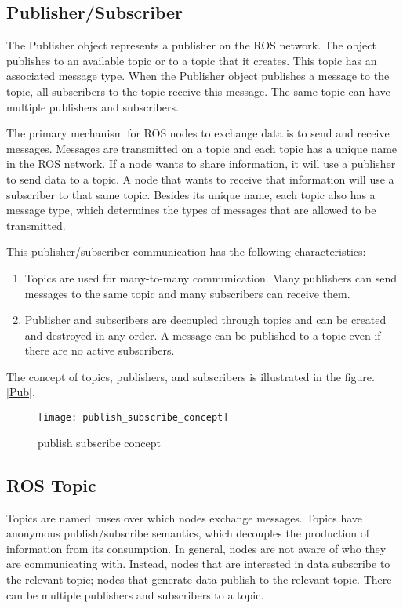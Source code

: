 \subsection{Publisher/Subscriber}
	The Publisher object represents a publisher on the ROS network. The object publishes to an available topic or to a topic that it creates. This topic has an associated message type. When the Publisher object publishes a message to the topic, all subscribers to the topic receive this message. The same topic can have multiple publishers and subscribers.
	
	The primary mechanism for ROS nodes to exchange data is to send and receive messages. Messages are transmitted on a topic and each topic has a unique name in the ROS network. If a node wants to share information, it will use a publisher to send data to a topic. A node that wants to receive that information will use a subscriber to that same topic. Besides its unique name, each topic also has a message type, which determines the types of messages that are allowed to be transmitted.
	
	This publisher/subscriber communication has the following characteristics:
	\begin{enumerate}
		\item Topics are used for many-to-many communication. Many publishers can send messages to the same topic and many subscribers can receive them.
		\item Publisher and subscribers are decoupled through topics and can be created and destroyed in any order. A message can be published to a topic even if there are no active subscribers.
	\end{enumerate}
	
	The concept of topics, publishers, and subscribers is illustrated in the figure.\ref{Pub}.
	\begin{figure}[h]		
		\centering
		\texttt{[image: publish\_subscribe\_concept]}
		\caption{publish subscribe concept}
		\label{Fig:Pub}
	\end{figure}


\subsection{ROS Topic}

	Topics are named buses over which nodes exchange messages. Topics have anonymous publish/subscribe semantics, which decouples the production of information from its consumption. In general, nodes are not aware of who they are communicating with. Instead, nodes that are interested in data subscribe to the relevant topic; nodes that generate data publish to the relevant topic. There can be multiple publishers and subscribers to a topic.
	
